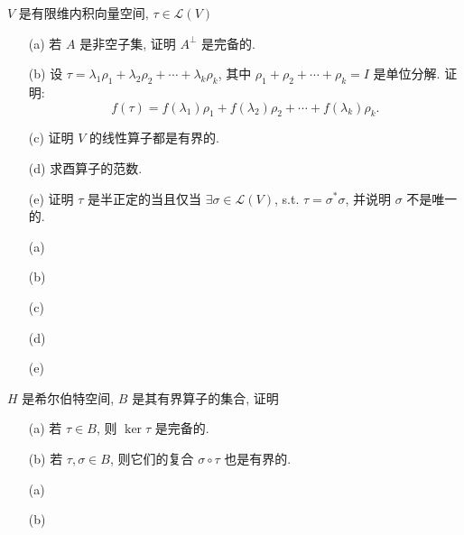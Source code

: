 \documentclass{assignment}
\begin{document}
\begin{prob}
    $V$ 是有限维内积向量空间, $\tau\in\mathcal{L}(V)$
    \begin{itemize}
        \item[(a)] 若 $A$ 是非空子集, 证明 $A^{\perp}$ 是完备的.
        \item[(b)] 设 $\tau=\lambda_1\rho_1+\lambda_2\rho_2+\cdots+\lambda_k\rho_k$, 其中 $\rho_1+\rho_2+\cdots+\rho_k=I$ 是单位分解. 证明:
        \[
            f(\tau)=f(\lambda_1)\rho_1+f(\lambda_2)\rho_2+\cdots+f(\lambda_k)\rho_k.
        \]
        \item[(c)] 证明 $V$ 的线性算子都是有界的.
        \item[(d)] 求酉算子的范数.
        \item[(e)] 证明 $\tau$ 是半正定的当且仅当 $\exists\sigma\in\mathcal{L}(V)$, s.t. $\tau=\sigma^*\sigma$, 并说明 $\sigma$ 不是唯一的.
    \end{itemize}
\end{prob}
\begin{sol}
    \begin{itemize}
        \item[(a)] 
        \item[(b)] 
        \item[(c)] 
        \item[(d)] 
        \item[(e)] 
    \end{itemize}
\end{sol}

\begin{prob}
    $H$ 是希尔伯特空间, $B$ 是其有界算子的集合, 证明
    \begin{itemize}
        \item[(a)] 若 $\tau\in B$, 则 $\ker\tau$ 是完备的.
        \item[(b)] 若 $\tau,\sigma\in B$, 则它们的复合 $\sigma\circ\tau$ 也是有界的.
    \end{itemize}
\end{prob}
\begin{pf}
    \begin{itemize}
        \item[(a)] 
        \item[(b)] 
    \end{itemize}
\end{pf}
\end{document}
